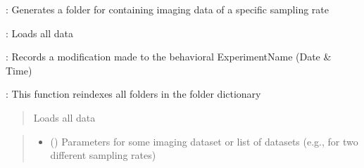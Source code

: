 \documentclass[letterpaper,10pt,english]{sphinxmanual}
\begin{document}
\begin{fulllineitems}
\begin{description}
\begin{DUlineblock}{0em}
\item[]  : Generates a folder for containing imaging data of a specific sampling rate
\item[]  : Loads all data
\item[]  :  Records a modification made to the behavioral ExperimentName (Date \& Time)
\item[]  : This function re\sphinxhyphen{}indexes all folders in the folder dictionary
\end{DUlineblock}

\end{description}

\begin{fulllineitems}
\label{\detokenize{Organization:Organization.BehavioralExperiment.load_data}}
\pysigstartsignatures
{}
\pysigstopsignatures\begin{quote}

\sphinxAtStartPar
Loads all data
\end{quote}
\begin{quote}\begin{description}
\begin{itemize}
\item {} 
\sphinxAtStartPar
{} (\sphinxstyleliteralemphasis{\sphinxupquote{{[}}}\sphinxstyleliteralemphasis{\sphinxupquote{{]}}}) \textendash{} Parameters for some imaging dataset or list of datasets (e.g., for two different sampling rates)


\end{itemize}
\end{description}
\end{quote}
\end{fulllineitems}
\end{fulllineitems}
\end{document}

